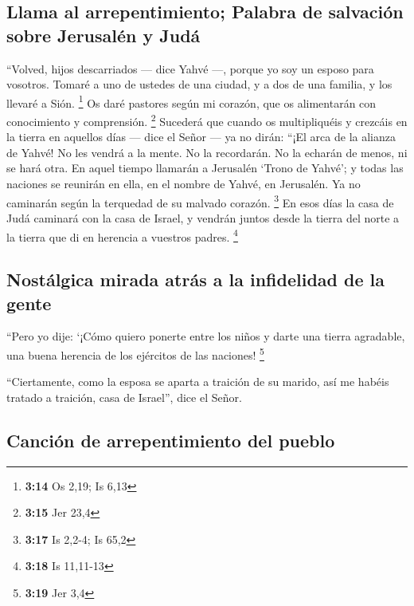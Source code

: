 \hypertarget{llama-al-arrepentimiento-palabra-de-salvaciuxf3n-sobre-jerusaluxe9n-y-juduxe1}{%
\subsection{Llama al arrepentimiento; Palabra de salvación sobre
Jerusalén y
Judá}\label{llama-al-arrepentimiento-palabra-de-salvaciuxf3n-sobre-jerusaluxe9n-y-juduxe1}}

 ``Volved, hijos descarriados --- dice Yahvé ---, porque
yo soy un esposo para vosotros. Tomaré a uno de ustedes de una ciudad, y
a dos de una familia, y los llevaré a Sión. \footnote{\textbf{3:14} Os
  2,19; Is 6,13}  Os daré pastores según mi corazón, que
os alimentarán con conocimiento y comprensión. \footnote{\textbf{3:15}
  Jer 23,4}  Sucederá que cuando os multipliquéis y
crezcáis en la tierra en aquellos días --- dice el Señor --- ya no
dirán: ``¡El arca de la alianza de Yahvé! No les vendrá a la mente. No
la recordarán. No la echarán de menos, ni se hará otra. 
En aquel tiempo llamarán a Jerusalén `Trono de Yahvé'; y todas las
naciones se reunirán en ella, en el nombre de Yahvé, en Jerusalén. Ya no
caminarán según la terquedad de su malvado corazón. \footnote{\textbf{3:17}
  Is 2,2-4; Is 65,2}  En esos días la casa de Judá
caminará con la casa de Israel, y vendrán juntos desde la tierra del
norte a la tierra que di en herencia a vuestros padres. \footnote{\textbf{3:18}
  Is 11,11-13}

\hypertarget{nostuxe1lgica-mirada-atruxe1s-a-la-infidelidad-de-la-gente}{%
\subsection{Nostálgica mirada atrás a la infidelidad de la
gente}\label{nostuxe1lgica-mirada-atruxe1s-a-la-infidelidad-de-la-gente}}

 ``Pero yo dije: `¡Cómo quiero ponerte entre los niños y
darte una tierra agradable, una buena herencia de los ejércitos de las
naciones! \footnote{\textbf{3:19} Jer 3,4}

 ``Ciertamente, como la esposa se aparta a traición de su
marido, así me habéis tratado a traición, casa de Israel'', dice el
Señor.

\hypertarget{canciuxf3n-de-arrepentimiento-del-pueblo}{%
\subsection{Canción de arrepentimiento del
pueblo}\label{canciuxf3n-de-arrepentimiento-del-pueblo}}

